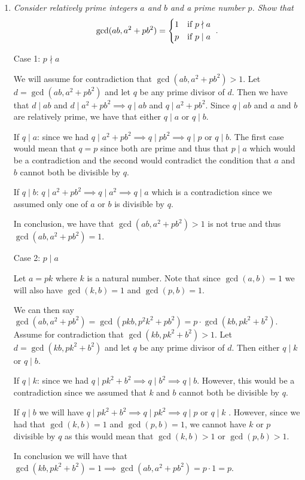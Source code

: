 \documentclass{article}
\begin{document}
\begin{enumerate}[1.]
\item %
{\itshape Consider relatively prime integers $a$ and $b$ and a prime number $p$.
Show that
\[ \gcd(ab, a^2+pb^2) = \begin{cases*} 1 & if $p \nmid a$ \\ p & if $p \mid a$ \end{cases*}. \]}

Case 1: $p \nmid a$ \par
We will assume for contradiction that $\gcd(ab, a^2+pb^2) > 1$. Let $d = \gcd(ab, a^2+pb^2)$ and let $q$ be any prime divisor of $d$. 
Then we have that $d \mid ab$ and $d \mid a^2+pb^2 \implies q \mid ab$ and $q \mid a^2+pb^2$. Since $q \mid ab$ and $a$ and $b$ are relatively prime, we have that either $q \mid a$ or $q \mid b$. \par
If $q \mid a$: since we had $q \mid a^2 + pb^2 \implies q \mid pb^2 \implies q \mid p$ or $q \mid b$. The first case would mean that $q = p$ since both are prime and thus that $p \mid a$ which would be a contradiction and the second would contradict the condition that $a$ and $b$ cannot both be divisible by $q$. \par
If $q \mid b$: $q \mid a^2 + pb^2 \implies q \mid a^2 \implies q \mid a$ which is a contradiction since we assumed only one of $a$ or $b$ is divisible by $q$. \par
In conclusion, we have that $\gcd(ab, a^2+pb^2) > 1$ is not true and thus $\gcd(ab, a^2+pb^2) = 1.$ \newline

Case 2: $p \mid a$ \par
Let $a = pk$ where $k$ is a natural number. Note that since $\gcd(a, b) = 1$ we will also have $\gcd(k, b) = 1$ and $\gcd(p, b) = 1.$ \par
We can then say $\gcd(ab, a^2+pb^2) = \gcd(pkb, p^2k^2 + pb^2) = p\cdot \gcd(kb, pk^2 + b^2).$ Assume for contradiction that $\gcd(kb, pk^2 + b^2) > 1$. Let $d = \gcd(kb, pk^2 + b^2)$ and let $q$ be any prime divisor of $d$. Then either $q \mid k$ or $q \mid b$. \par
If $q \mid k$: since we had $q \mid pk^2 + b^2 \implies q \mid b^2 \implies q \mid b$. However, this would be a contradiction since we assumed that $k$ and $b$ cannot both be divisible by $q$. \par
If $q \mid b$ we will have  $q \mid pk^2 + b^2 \implies q \mid pk^2 \implies q \mid p$ or $q \mid k$ . However, since we had that $\gcd(k, b) = 1$ and $\gcd(p, b) = 1$, we cannot have $k$ or $p$ divisible by $q$ as this would mean that $\gcd(k, b) > 1$ or $\gcd(p, b) > 1$. \par
In conclusion we will have that $\gcd(kb, pk^2 + b^2) = 1 \implies \gcd(ab, a^2+pb^2) = p\cdot 1 = p$.



\end{enumerate}
\end{document}
